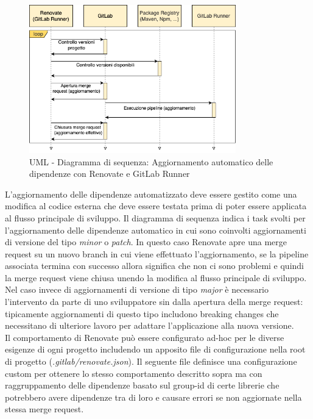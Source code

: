 \begin{figure}[H]
\centering
\includegraphics[width=0.8\textwidth]{img/tesi-2-Page-17.drawio.png}
\caption{UML - Diagramma di sequenza: Aggiornamento automatico delle dipendenze con Renovate e GitLab Runner}
\end{figure}

L'aggiornamento delle dipendenze automatizzato deve essere gestito come una modifica al codice esterna che deve essere testata prima di poter essere applicata al flusso principale di sviluppo. Il diagramma di sequenza indica i task svolti per l'aggiornamento delle dipendenze automatico in cui sono coinvolti aggiornamenti di versione del tipo \textit{minor} o \textit{patch}. In questo caso Renovate apre una merge request su un nuovo branch in cui viene effettuato l'aggiornamento, se la pipeline associata termina con successo allora significa che non ci sono problemi e quindi la merge request viene chiusa unendo la modifica al flusso principale di sviluppo. Nel caso invece di aggiornamenti di versione di tipo \textit{major} è necessario l'intervento da parte di uno sviluppatore sin dalla apertura della merge request: tipicamente aggiornamenti di questo tipo includono breaking changes che necessitano di ulteriore lavoro per adattare l'applicazione alla nuova versione.\\
Il comportamento di Renovate può essere configurato ad-hoc per le diverse esigenze di ogni progetto includendo un apposito file di configurazione nella root di progetto (\textit{.gitlab/renovate.json}). Il seguente file definisce una configurazione custom per ottenere lo stesso comportamento descritto sopra ma con raggruppamento delle dipendenze basato sul group-id di certe librerie che potrebbero avere dipendenze tra di loro e causare errori se non aggiornate nella stessa merge request.

